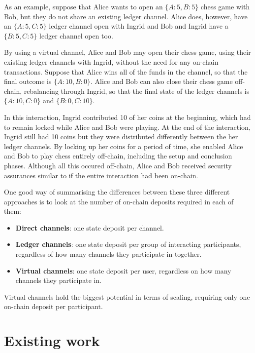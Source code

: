\documentclass{article}
\begin{document}
As an example, suppose that Alice wants to open an $\{A:5, B:5\}$ chess game with Bob, but they do not share an existing ledger channel.
Alice does, however, have an $\{A:5, C:5\}$ ledger channel open with Ingrid and Bob and Ingrid have a $\{B:5, C:5\}$ ledger channel open too.

By using a virtual channel, Alice and Bob may open their chess game, using their existing ledger channels with Ingrid, without the need for any on-chain transactions.
Suppose that Alice wins all of the funds in the channel, so that the final outcome is $\{A: 10, B: 0\}$.
Alice and Bob can also close their chess game off-chain, rebalancing through Ingrid, so that the final state of the ledger channels is $\{A: 10, C: 0\}$ and $\{B: 0, C: 10\}$.

In this interaction, Ingrid contributed 10 of her coins at the beginning, which had to remain locked while Alice and Bob were playing.
At the end of the interaction, Ingrid still had 10 coins but they were distributed differently between the her ledger channels.
By locking up her coins for a period of time, she enabled Alice and Bob to play chess entirely off-chain, including the setup and conclusion phases.
Although all this occured off-chain, Alice and Bob received security assurances similar to if the entire interaction had been on-chain.

One good way of summarising the differences between these three different approaches is to look at the number of on-chain deposits required in each of them:
\begin{itemize}
  \item \textbf{Direct channels}: one state deposit per channel.
  \item \textbf{Ledger channels}: one state deposit per group of interacting participants, regardless of how many channels they participate in together.
  \item \textbf{Virtual channels}: one state deposit per user, regardless on how many channels they participate in.
\end{itemize}
Virtual channels hold the biggest potential in terms of scaling, requiring only one on-chain deposit per participant.

\section{Existing work}
\end{document}
